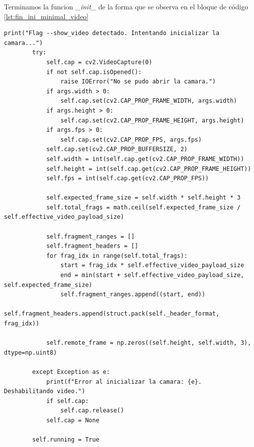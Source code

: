 Terminamos la funcion \textit{\_init\_} de la forma que se observa en el bloque de código \ref{lst:fin_ini_minimal_video}
\vspace{\baselineskip}
\begin{lstlisting}[style=pythonstyle, caption={Fin de la inicialización de Minimal\_Video}, label={lst:fin_ini_minimal_video}]
print("Flag --show_video detectado. Intentando inicializar la camara...")
        try:
            self.cap = cv2.VideoCapture(0)
            if not self.cap.isOpened():
                raise IOError("No se pudo abrir la camara.")
            if args.width > 0:
                self.cap.set(cv2.CAP_PROP_FRAME_WIDTH, args.width)
            if args.height > 0:
                self.cap.set(cv2.CAP_PROP_FRAME_HEIGHT, args.height)
            if args.fps > 0:
                self.cap.set(cv2.CAP_PROP_FPS, args.fps)
            self.cap.set(cv2.CAP_PROP_BUFFERSIZE, 2)
            self.width = int(self.cap.get(cv2.CAP_PROP_FRAME_WIDTH))
            self.height = int(self.cap.get(cv2.CAP_PROP_FRAME_HEIGHT))
            self.fps = int(self.cap.get(cv2.CAP_PROP_FPS))

            self.expected_frame_size = self.width * self.height * 3
            self.total_frags = math.ceil(self.expected_frame_size / self.effective_video_payload_size)

            self.fragment_ranges = []
            self.fragment_headers = []
            for frag_idx in range(self.total_frags):
                start = frag_idx * self.effective_video_payload_size
                end = min(start + self.effective_video_payload_size, self.expected_frame_size)
                self.fragment_ranges.append((start, end))
                self.fragment_headers.append(struct.pack(self._header_format, frag_idx))

            self.remote_frame = np.zeros((self.height, self.width, 3), dtype=np.uint8)
            
        except Exception as e:
            print(f"Error al inicializar la camara: {e}. Deshabilitando video.")
            if self.cap:
                self.cap.release()
            self.cap = None

        self.running = True
\end{lstlisting}

